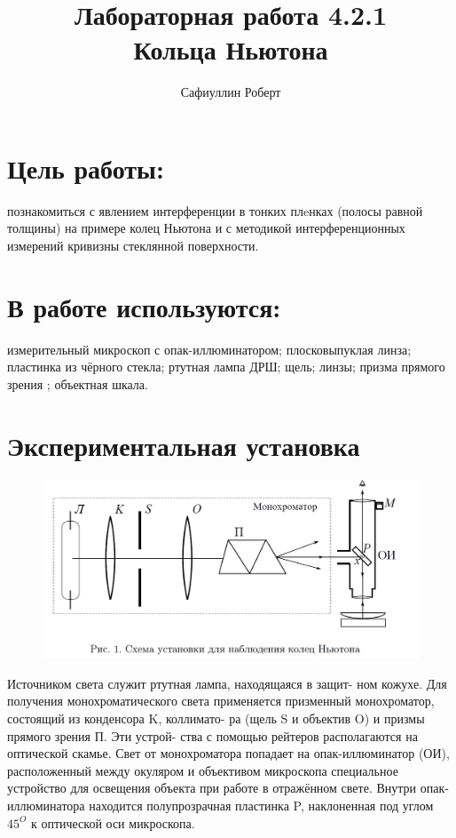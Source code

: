 \documentclass[a4paper,12pt]{article} %
\author{Сафиуллин Роберт	}
\title{Лабораторная работа  4.2.1\\ Кольца Ньютона}
\begin{document}

\maketitle


\newpage

\section{Цель работы:}

познакомиться с явлением интерференции в тонких
плeнках (полосы равной толщины) на примере колец Ньютона и с методикой интерференционных измерений кривизны стеклянной поверхности.

\section{В работе используются:}
измерительный микроскоп с опак-иллюминатором; плосковыпуклая линза; пластинка из чёрного стекла; ртутная лампа ДРШ; щель; линзы; призма прямого зрения ; объектная шкала.


\section{Экспериментальная установка}

\begin{figure}[H]
	\centering
	\includegraphics[width = 12 cm]{ust.png}
	
\end{figure}


Источником света служит ртутная лампа, находящаяся в защит-
ном кожухе. Для получения монохроматического света применяется
призменный монохроматор, состоящий из конденсора K, коллимато-
ра (щель S и объектив O) и призмы прямого зрения П. Эти устрой-
ства с помощью рейтеров располагаются на оптической скамье. Свет от
монохроматора попадает на опак-иллюминатор (ОИ), расположенный
между окуляром и объективом микроскопа специальное устройство
для освещения объекта при работе в отражённом свете. Внутри опак-
иллюминатора находится полупрозрачная пластинка P, наклоненная
под углом $45^O$ к оптической оси микроскопа.
\end{document}
